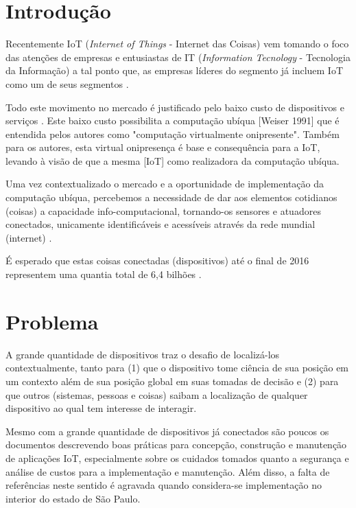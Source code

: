 \documentclass[
	12pt,				%
	openright,			%
	oneside,			%
	a4paper,			%
	chapter=TITLE,		%
	english,			%
	french,				%
	spanish,			%
	brazil				%
	]{abntex2}
\begin{document}
{%
\chapter[Introdução]{Introdução}
Recentemente IoT (\textit{Internet of Things} - Internet das Coisas) vem tomando o foco das atenções de empresas e entusiastas de IT (\textit{Information Tecnology} - Tecnologia da Informação) \cite{DzoneIoT:2015}a tal ponto que, as empresas líderes do segmento já incluem IoT como um de seus segmentos \cite{Ibm2016} \cite{ARM} \cite{Microsoft2016} \cite{Intel2016} \cite{Oracle2016} \cite{Google2016} \cite{AmazonIoT2016}.

Todo este movimento no mercado é justificado pelo baixo custo de dispositivos \cite{Raspberryfundation2012} \cite{Esp8266.net} e serviços \cite{Kaufmann2015} \cite{Amazon2016}. Este baixo custo possibilita a computação ubíqua [Weiser 1991] que é entendida pelos autores como "computação virtualmente onipresente". Também para os autores, esta virtual onipresença é base e consequência para a IoT, levando à visão de que a mesma [IoT] como realizadora da computação ubíqua.

Uma vez contextualizado o mercado e a oportunidade de implementação da computação ubíqua, percebemos a necessidade de dar aos elementos cotidianos (coisas) a capacidade info-computacional, tornando-os sensores e atuadores conectados, unicamente identificáveis e acessíveis através da rede mundial (internet) \cite{Lemos2013} \cite{Kranenburg2012}.

É esperado que estas coisas conectadas (dispositivos) até o final de 2016 representem uma quantia total de 6,4 bilhões \cite{GARTNER2016}.



\chapter{Problema}
A grande quantidade de dispositivos traz o desafio de localizá-los contextualmente, tanto para (1) que o dispositivo tome ciência de sua posição em um contexto além de sua posição global em suas tomadas de decisão e (2) para que outros (sistemas, pessoas e coisas) saibam a localização de qualquer dispositivo ao qual tem interesse de interagir.

Mesmo com a grande quantidade de dispositivos já conectados são poucos os documentos descrevendo boas práticas para concepção, construção e manutenção de aplicações IoT, especialmente sobre os cuidados tomados quanto a segurança e análise de custos para a implementação e manutenção. Além disso, a falta de referências neste sentido é agravada quando considera-se implementação no interior do estado de São Paulo.


}
\end{document}
